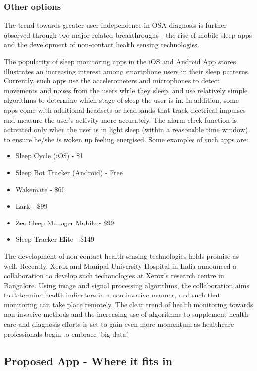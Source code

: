 \subsubsection{Other options}

The trend towards greater user independence in OSA diagnosis is further
observed through two major related breakthroughs - the rise of mobile
sleep apps and the development of non-contact health sensing technologies.

The popularity of sleep monitoring apps in the iOS and Android App
stores illustrates an increasing interest among smartphone users in
their sleep patterns. Currently, such apps use the accelerometers
and microphones to detect movements and noises from the users while they sleep, and use relatively simple algorithms to determine which stage of sleep the user is in. In addition, some apps come with additional headsets or headbands that track electrical impulses and measure the user's activity more accurately. The alarm clock function is activated only when the user is in light sleep (within a reasonable time window) to ensure he/she is woken up feeling energised. Some examples of such apps are:

\begin{itemize}
\item Sleep Cycle (iOS) - \$1
\item Sleep Bot Tracker (Android) - Free
\item Wakemate - \$60
\item Lark - \$99
\item Zeo Sleep Manager Mobile - \$99
\item Sleep Tracker Elite - \$149 
\end{itemize}

The development of non-contact health sensing technologies holds promise as well. Recently, Xerox and Manipal University Hospital in India announced a collaboration to develop such techonologies at Xerox's research centre in Bangalore. Using image and signal processing algorithms, the collaboration aims to determine health indicators in a non-invasive manner, and such that monitoring can take place remotely. The clear trend of health monitoring towards non-invasive methods and the increasing use of algorithms to supplement health care and diagnosis efforts is set to gain even more momentum as healthcare professionals begin to embrace 'big data'.

\subsection{Proposed App - Where it fits in}

